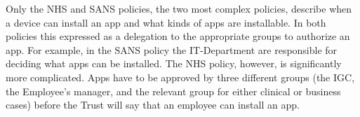 \documentclass{llncs}
\newenvironment{policyrule}[1]{%
  \begin{mdframed}[]\footnotesize
      \noindent\textbf{\sffamily #1}:~\itshape%
}{%
  \end{mdframed}
}
\begin{document}
Only the NHS and SANS policies, the two most complex policies, describe when a device can install an app and what kinds of apps are installable.
In both policies this expressed as a delegation to the appropriate groups to authorize an app.
For example, in the SANS policy the IT-Department are responsible for deciding what apps can be installed.
The NHS policy, however, is significantly more complicated.
Apps have to be approved by three different groups (the IGC, the Employee's manager, and the relevant group for either clinical or business cases) before the Trust will say that an employee can install an app.
\end{document}
